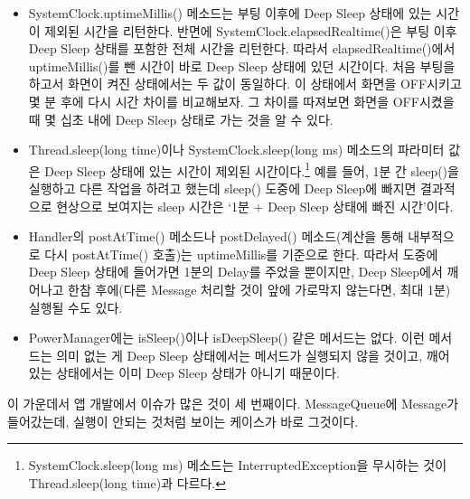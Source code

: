 \begin{itemize}
\item SystemClock.uptimeMillis() 메소드는 부팅 이후에 Deep Sleep 상태에 있는 시간이 제외된 시간을 리턴한다. 반면에 SystemClock.elapsedRealtime()은 부팅 이후 Deep Sleep 상태를 포함한 전체 시간을 리턴한다. 
따라서 elapsedRealtime()에서 uptimeMillis()를 뺀 시간이 바로 Deep Sleep 상태에 있던 시간이다. 
처음 부팅을 하고서 화면이 켜진 상태에서는 두 값이 동일하다. 이 상태에서 화면을 OFF시키고 몇 분 후에 다시 시간 차이를 비교해보자. 그 차이를 따져보면 화면을 OFF시켰을 때 몇 십초 내에 Deep Sleep 상태로 가는 것을 알 수 있다.

\item Thread.sleep(long time)이나 SystemClock.sleep(long ms) 메소드의 파라미터 값은 Deep Sleep 상태에 있는 시간이 제외된 시간이다.\footnote{SystemClock.sleep(long ms) 메소드는 InterruptedException을 무시하는 것이 Thread.sleep(long time)과 다르다.} 예를 들어, 1분 간 sleep()을 실행하고 다른 작업을 하려고 했는데 sleep() 도중에 Deep Sleep에 빠지면 결과적으로 현상으로 보여지는 sleep 시간은 `1분 + Deep Sleep 상태에 빠진 시간'이다. 

\item Handler의 postAtTime() 메소드나 postDelayed() 메소드(계산을 통해 내부적으로 다시 postAtTime() 호출)는 uptimeMillis를 기준으로 한다. 
따라서 도중에 Deep Sleep 상태에 들어가면 1분의 Delay를 주었을 뿐이지만, Deep Sleep에서 깨어나고 한참 후에(다른 Message 처리할 것이 앞에 가로막지 않는다면, 최대 1분) 실행될 수도 있다.
\item PowerManager에는 isSleep()이나 isDeepSleep() 같은 메서드는 없다. 이런 메서드는 의미 없는 게 Deep Sleep 상태에서는 메서드가 실행되지 않을 것이고, 깨어 있는 상태에서는 이미 Deep Sleep 상태가 아니기 때문이다.
\end{itemize}

이 가운데서 앱 개발에서 이슈가 많은 것이 세 번째이다. 
MessageQueue에 Message가 들어갔는데, 실행이 안되는 것처럼 보이는 케이스가 바로 그것이다.\\

